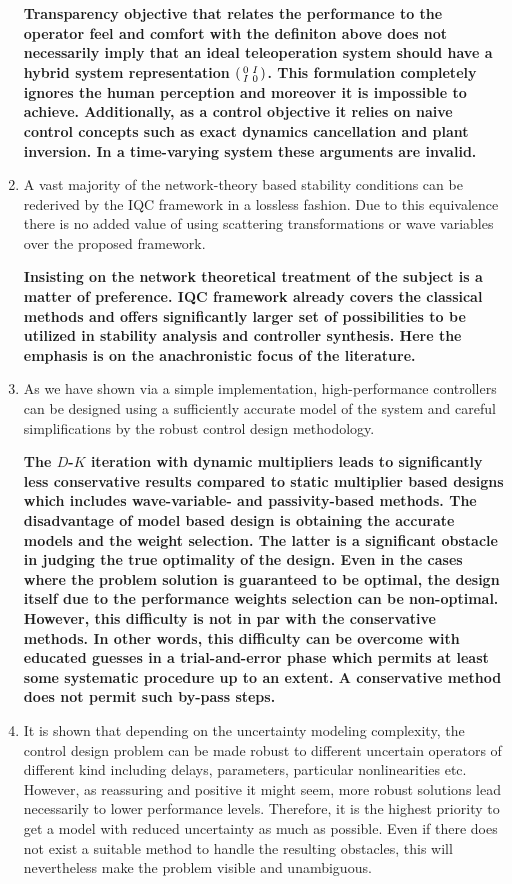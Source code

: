 \begin{enumerate}
    {\bfseries Transparency objective that relates the performance to the operator feel and comfort with the definiton above does not 
    necessarily imply that an ideal teleoperation system should have a hybrid system representation
    $\begin{psmallmatrix}0&I\\I&0\end{psmallmatrix}$. 
    This formulation completely ignores the human perception and moreover it is impossible to achieve. Additionally, as a control objective 
    it relies on naive control concepts such as exact dynamics cancellation and plant inversion. In a time-varying system these arguments 
    are invalid.
    }
    \item A vast majority of the network-theory based stability conditions can be rederived by the IQC framework in a lossless fashion. 
    Due to this equivalence there is no added value of using scattering transformations or wave variables over the proposed framework. 
    
    {\bfseries Insisting on the network theoretical treatment of the subject is a matter of preference. IQC framework already covers the 
    classical methods and offers significantly larger set of possibilities to be utilized in stability analysis and controller synthesis. 
    Here the emphasis is on the anachronistic focus of the literature. 
    }
    \item As we have shown via a simple implementation, high-performance controllers can be designed using a sufficiently accurate model of
    the system and careful simplifications by the robust control design methodology. 
    
    {\bfseries The $D$-$K$ iteration with dynamic multipliers leads to significantly less conservative results compared to static multiplier 
    based designs which includes wave-variable- and passivity-based methods. The disadvantage of model based design is obtaining the 
    accurate models and the weight selection. The latter is a significant obstacle in judging the true optimality of the design. Even in the 
    cases where the problem solution is guaranteed to be optimal, the design itself due to the performance weights selection can be 
    non-optimal. However, this difficulty is not in par with the conservative methods. In other words, this difficulty can be overcome with 
    educated guesses in a trial-and-error phase which permits at least some systematic procedure up to an extent. A conservative method does 
    not permit such by-pass steps.
    }
    \item It is shown that depending on the uncertainty modeling complexity, the control design problem can be made robust to different 
    uncertain operators of different kind including delays, parameters, particular nonlinearities etc. However, as reassuring and positive 
    it might seem, more robust solutions lead necessarily to lower performance levels. Therefore, it is the highest priority to get a 
    model with reduced uncertainty as much as possible. Even if there does not exist a suitable method to handle the resulting obstacles, 
    this will nevertheless make the problem visible and unambiguous. 
    

\end{enumerate}
